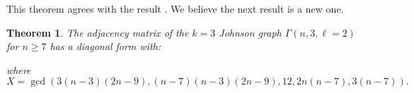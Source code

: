 \documentclass[11pt]{article}
\newtheorem{theorem}[theo]{Theorem}
\theoremstyle{definition}
\numberwithin{equation}{section}
\numberwithin{equation}{section}
\newcommand{\G}[0]{\Gamma}
\begin{document}
This theorem agrees with the result \cite[Theorem SNF3]{brouwer:prank}.  We believe the next result is a new one.


\begin{theorem}
The adjacency matrix of the $k=3$ Johnson graph $\G(n, 3, \ell = 2)$ for $n \geq 7$ has a diagonal form with:
\begin{center}
\end{center}
where 
\[X = \gcd(3(n-3)(2n-9), (n-7)(n-3)(2n-9), 12, 2n(n-7), 3(n-7)).\]
\end{theorem}
\end{document}
